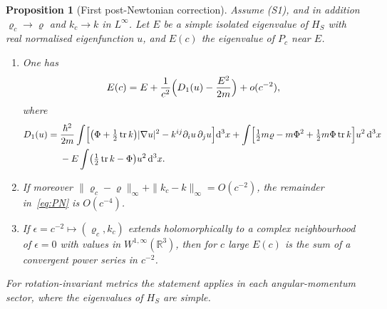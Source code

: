 \documentclass[%
 aip,
 jmp,
 amsmath,amssymb,
 reprint, onecolumn
]{revtex4-1}
\newtheorem{proposition}{Proposition}
\theoremstyle{definition}
\theoremstyle{remark}
\newcommand{\R}{\mathbb{R}}
\newcommand{\rmd}{\mathrm{d}}
\begin{document}
\begin{proposition}[First post-Newtonian correction]\label{prop:PN}
Assume (S1), and in addition $\varrho_c\to\varrho$ and $k_c\to k$ in
$L^\infty$. Let $E$ be a simple isolated eigenvalue of $H_S$ with real
normalised eigenfunction $u$, and $E(c)$ the eigenvalue of $P_c$ near
$E$.
\begin{enumerate}[label=(\roman*)]
\item One has
\begin{equation}\label{eq:PN}
E(c)=E+\frac{1}{c^2}\Bigl(D_1(u)-\frac{E^2}{2m}\Bigr)+o(c^{-2}),
\end{equation}
where
\begin{align*}
D_1(u)={}&\frac{\hbar^2}{2m}\int\Bigl[\bigl(\Phi+\tfrac12\operatorname{tr}k\bigr)
|\nabla u|^2-k^{ij}\partial_iu\,\partial_ju\Bigr]\rmd^3x
+\int\Bigl[\tfrac12m\varrho-m\Phi^2+\tfrac12m\Phi\operatorname{tr}k
\Bigr]u^2\,\rmd^3x\\
&-E\int\bigl(\tfrac12\operatorname{tr}k-\Phi\bigr)u^2\,\rmd^3x .
\end{align*}
\item If moreover $\|\varrho_c-\varrho\|_\infty+\|k_c-k\|_\infty=
O(c^{-2})$, the remainder in~\eqref{eq:PN} is $O(c^{-4})$.
\item If $\epsilon=c^{-2}\mapsto(\varrho_c,k_c)$ extends holomorphically
to a complex neighbourhood of $\epsilon=0$ with values in
$W^{1,\infty}(\R^3)$, then for $c$ large $E(c)$ is the sum of a
convergent power series in $c^{-2}$.
\end{enumerate}
For rotation-invariant metrics the statement applies in each
angular-momentum sector, where the eigenvalues of $H_S$ are simple.
\end{proposition}
\end{document}

